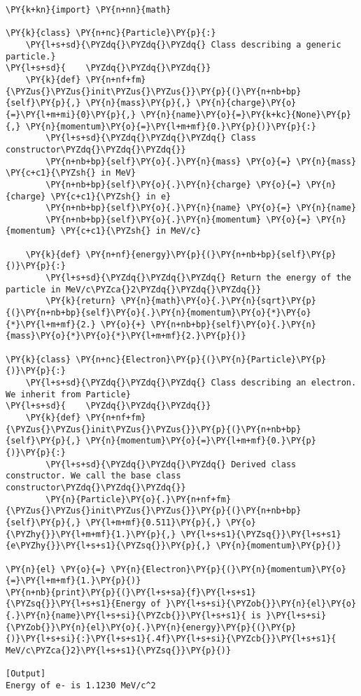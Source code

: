 \begin{Verbatim}[label=\makebox{\url{https://github.com/lucabaldini/cmepda/tree/master/slides/latex/snippets/inheritance.py}},commandchars=\\\{\}]
\PY{k+kn}{import} \PY{n+nn}{math}

\PY{k}{class} \PY{n+nc}{Particle}\PY{p}{:}
    \PY{l+s+sd}{\PYZdq{}\PYZdq{}\PYZdq{} Class describing a generic particle.}
\PY{l+s+sd}{    \PYZdq{}\PYZdq{}\PYZdq{}}
    \PY{k}{def} \PY{n+nf+fm}{\PYZus{}\PYZus{}init\PYZus{}\PYZus{}}\PY{p}{(}\PY{n+nb+bp}{self}\PY{p}{,} \PY{n}{mass}\PY{p}{,} \PY{n}{charge}\PY{o}{=}\PY{l+m+mi}{0}\PY{p}{,} \PY{n}{name}\PY{o}{=}\PY{k+kc}{None}\PY{p}{,} \PY{n}{momentum}\PY{o}{=}\PY{l+m+mf}{0.}\PY{p}{)}\PY{p}{:}
        \PY{l+s+sd}{\PYZdq{}\PYZdq{}\PYZdq{} Class constructor\PYZdq{}\PYZdq{}\PYZdq{}}
        \PY{n+nb+bp}{self}\PY{o}{.}\PY{n}{mass} \PY{o}{=} \PY{n}{mass} \PY{c+c1}{\PYZsh{} in MeV}
        \PY{n+nb+bp}{self}\PY{o}{.}\PY{n}{charge} \PY{o}{=} \PY{n}{charge} \PY{c+c1}{\PYZsh{} in e}
        \PY{n+nb+bp}{self}\PY{o}{.}\PY{n}{name} \PY{o}{=} \PY{n}{name}
        \PY{n+nb+bp}{self}\PY{o}{.}\PY{n}{momentum} \PY{o}{=} \PY{n}{momentum} \PY{c+c1}{\PYZsh{} in MeV/c}

    \PY{k}{def} \PY{n+nf}{energy}\PY{p}{(}\PY{n+nb+bp}{self}\PY{p}{)}\PY{p}{:}
        \PY{l+s+sd}{\PYZdq{}\PYZdq{}\PYZdq{} Return the energy of the particle in MeV/c\PYZca{}2\PYZdq{}\PYZdq{}\PYZdq{}}
        \PY{k}{return} \PY{n}{math}\PY{o}{.}\PY{n}{sqrt}\PY{p}{(}\PY{n+nb+bp}{self}\PY{o}{.}\PY{n}{momentum}\PY{o}{*}\PY{o}{*}\PY{l+m+mf}{2.} \PY{o}{+} \PY{n+nb+bp}{self}\PY{o}{.}\PY{n}{mass}\PY{o}{*}\PY{o}{*}\PY{l+m+mf}{2.}\PY{p}{)}

\PY{k}{class} \PY{n+nc}{Electron}\PY{p}{(}\PY{n}{Particle}\PY{p}{)}\PY{p}{:}
    \PY{l+s+sd}{\PYZdq{}\PYZdq{}\PYZdq{} Class describing an electron. We inherit from Particle}
\PY{l+s+sd}{    \PYZdq{}\PYZdq{}\PYZdq{}}
    \PY{k}{def} \PY{n+nf+fm}{\PYZus{}\PYZus{}init\PYZus{}\PYZus{}}\PY{p}{(}\PY{n+nb+bp}{self}\PY{p}{,} \PY{n}{momentum}\PY{o}{=}\PY{l+m+mf}{0.}\PY{p}{)}\PY{p}{:}
        \PY{l+s+sd}{\PYZdq{}\PYZdq{}\PYZdq{} Derived class constructor. We call the base class constructor\PYZdq{}\PYZdq{}\PYZdq{}}
        \PY{n}{Particle}\PY{o}{.}\PY{n+nf+fm}{\PYZus{}\PYZus{}init\PYZus{}\PYZus{}}\PY{p}{(}\PY{n+nb+bp}{self}\PY{p}{,} \PY{l+m+mf}{0.511}\PY{p}{,} \PY{o}{\PYZhy{}}\PY{l+m+mf}{1.}\PY{p}{,} \PY{l+s+s1}{\PYZsq{}}\PY{l+s+s1}{e\PYZhy{}}\PY{l+s+s1}{\PYZsq{}}\PY{p}{,} \PY{n}{momentum}\PY{p}{)}

\PY{n}{el} \PY{o}{=} \PY{n}{Electron}\PY{p}{(}\PY{n}{momentum}\PY{o}{=}\PY{l+m+mf}{1.}\PY{p}{)}
\PY{n+nb}{print}\PY{p}{(}\PY{l+s+sa}{f}\PY{l+s+s1}{\PYZsq{}}\PY{l+s+s1}{Energy of }\PY{l+s+si}{\PYZob{}}\PY{n}{el}\PY{o}{.}\PY{n}{name}\PY{l+s+si}{\PYZcb{}}\PY{l+s+s1}{ is }\PY{l+s+si}{\PYZob{}}\PY{n}{el}\PY{o}{.}\PY{n}{energy}\PY{p}{(}\PY{p}{)}\PY{l+s+si}{:}\PY{l+s+s1}{.4f}\PY{l+s+si}{\PYZcb{}}\PY{l+s+s1}{ MeV/c\PYZca{}2}\PY{l+s+s1}{\PYZsq{}}\PY{p}{)}

[Output]
Energy of e- is 1.1230 MeV/c^2
\end{Verbatim}